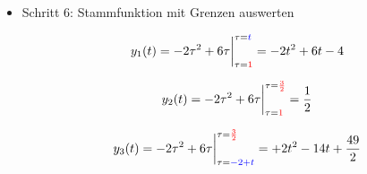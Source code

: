 \documentclass[11pt,a4paper,DIV=12]{scrartcl}
\numberwithin{equation}{section}
\numberwithin{figure}{section}
\newcommand{\red}{\textcolor{red}}
\newcommand{\blue}{\textcolor{blue}}
\begin{document}
\begin{ExCalc}
\begin{itemize}

  \item Schritt 6:  Stammfunktion mit Grenzen auswerten

  \begin{equation}
  y_1(t) = -2 \tau^2 +6 \tau\bigg|_{\tau=\red{1}}^{\tau=\blue{t}}
  = -2 t^2 + 6 t - 4
  \end{equation}

  \begin{equation}
  y_2(t) = -2 \tau^2 +6 \tau\bigg|_{\tau=\red{1}}^{\tau=\red{\frac{3}{2}}}  = \frac{1}{2}
  \end{equation}

  \begin{equation}
  y_3(t) = -2 \tau^2 +6 \tau\bigg|_{\tau=\blue{-2+t}}^{\tau=\red{\frac{3}{2}}} = +2 t^2 - 14 t + \frac{49}{2}
  \end{equation}

\end{itemize}
\end{ExCalc}
\end{document}
